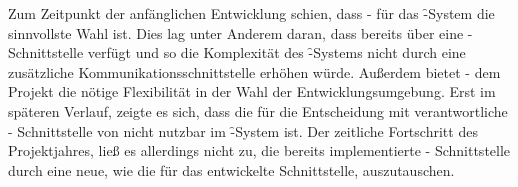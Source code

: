 Zum Zeitpunkt der anfänglichen Entwicklung schien, dass
- für das \f-System die sinnvollste Wahl ist. Dies
lag unter Anderem daran, dass  bereits über eine
- Schnittstelle verfügt und so die Komplexität des
\f-Systems nicht durch eine zusätzliche Kommunikationsschnittstelle
erhöhen würde. Außerdem bietet - dem Projekt die
nötige Flexibilität in der Wahl der Entwicklungsumgebung. Erst im
späteren Verlauf, zeigte es sich, dass die für die Entscheidung mit
verantwortliche - Schnittstelle von  nicht
nutzbar im \f-System ist. Der zeitliche Fortschritt des Projektjahres,
ließ es allerdings nicht zu, die bereits implementierte
- Schnittstelle durch eine neue, wie die für das
 entwickelte  Schnittstelle, auszutauschen.

